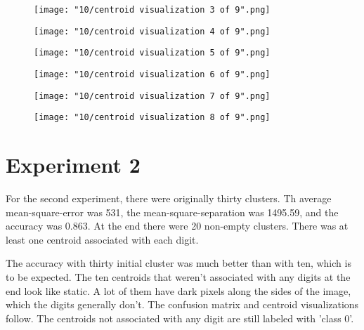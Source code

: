 \documentclass{article}
\begin{document}
\begin{figure}[h!]
    \noindent\texttt{[image: "10/centroid visualization 3 of 9".png]}
\end{figure}


\begin{figure}[h!]
    \noindent\texttt{[image: "10/centroid visualization 4 of 9".png]}
\end{figure}


\begin{figure}[h!]
    \noindent\texttt{[image: "10/centroid visualization 5 of 9".png]}
\end{figure}


\begin{figure}[h!]
    \noindent\texttt{[image: "10/centroid visualization 6 of 9".png]}
\end{figure}


\begin{figure}[h!]
    \noindent\texttt{[image: "10/centroid visualization 7 of 9".png]}
\end{figure}


\begin{figure}[h!]
    \noindent\texttt{[image: "10/centroid visualization 8 of 9".png]}
\end{figure}


\clearpage
\section{Experiment 2}

\begin{flushleft}
For the second experiment, there were originally thirty clusters.  Th average mean-square-error was 531, the mean-square-separation was 1495.59, and the accuracy was 0.863.  At the end there were 20 non-empty clusters.  There was at least one centroid associated with each digit.
\end{flushleft}

\begin{flushleft}
The accuracy with thirty initial cluster was much better than with ten, which is to be expected.  The ten centroids that weren't associated with any digits at the end look like static.  A lot of them have dark pixels along the sides of the image, which the digits generally don't.  The confusion matrix and centroid visualizations follow.  The centroids not associated with any digit are still labeled with 'class 0'. 
\end{flushleft}
\end{document}

